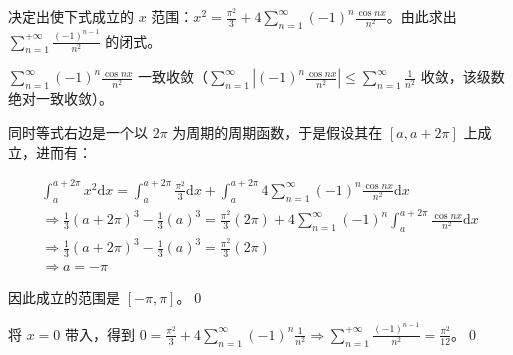 \begin{ques}
	决定出使下式成立的 $\displaystyle x$ 范围：$\displaystyle x^{2} =\frac{\pi ^{2}}{3} +4\sum _{n=1}^{\infty }( -1)^{n}\frac{\cos nx}{n^{2}}$。由此求出 $\displaystyle \sum _{n=1}^{+\infty }\frac{( -1)^{n-1}}{n^{2}}$ 的闭式。
\end{ques}

$\displaystyle \sum _{n=1}^{\infty }( -1)^{n}\frac{\cos nx}{n^{2}}$ 一致收敛（$\displaystyle \sum _{n=1}^{\infty }\left| ( -1)^{n}\frac{\cos nx}{n^{2}}\right| \leqslant \sum _{n=1}^{\infty }\frac{1}{n^{2}}$ 收敛，该级数绝对一致收敛）。

同时等式右边是一个以 $\displaystyle 2\pi $ 为周期的周期函数，于是假设其在 $\displaystyle [ a,a+2\pi ]$ 上成立，进而有：




\begin{gather*}
	\int _{a}^{a+2\pi } x^{2}\mathrm{d} x=\int _{a}^{a+2\pi }\frac{\pi ^{2}}{3}\mathrm{d} x+\int _{a}^{a+2\pi } 4\sum _{n=1}^{\infty }( -1)^{n}\frac{\cos nx}{n^{2}}\mathrm{d} x\\
	\Rightarrow \frac{1}{3}( a+2\pi )^{3} -\frac{1}{3}( a)^{3} =\frac{\pi ^{2}}{3}( 2\pi ) +4\sum _{n=1}^{\infty }( -1)^{n}\int _{a}^{a+2\pi }\frac{\cos nx}{n^{2}}\mathrm{d} x\\
	\Rightarrow \frac{1}{3}( a+2\pi )^{3} -\frac{1}{3}( a)^{3} =\frac{\pi ^{2}}{3}( 2\pi )\\
	\Rightarrow a=-\pi 
\end{gather*}

因此成立的范围是 $\displaystyle [ -\pi ,\pi ]$。\qed 



将 $\displaystyle x=0$ 带入，得到 $\displaystyle 0=\frac{\pi ^{2}}{3} +4\sum _{n=1}^{\infty }( -1)^{n}\frac{1}{n^{2}} \Rightarrow \sum _{n=1}^{+\infty }\frac{( -1)^{n-1}}{n^{2}} =\frac{\pi ^{2}}{12}$。\qed 
\ifx\allfiles\undefined

\fi
